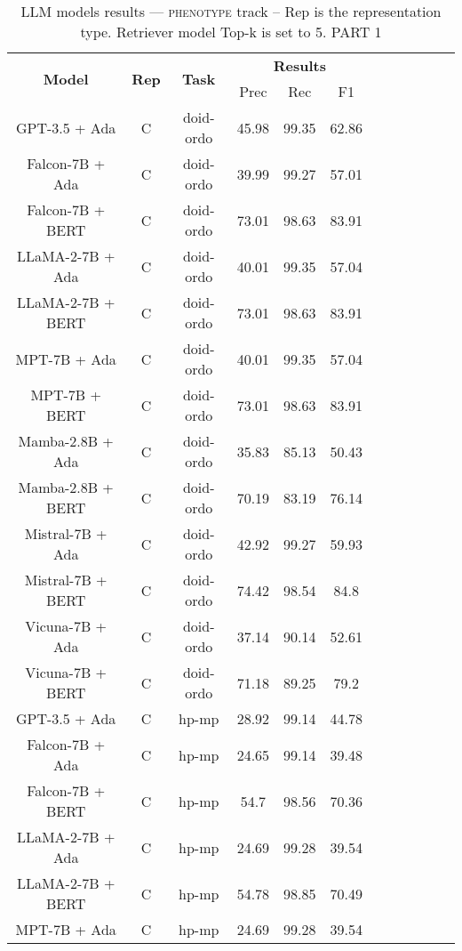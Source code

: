 \begin{table}
        \centering
        \small
        \caption{LLM models results --- \textsc{phenotype} track -- Rep is the representation type. Retriever model Top-k is set to 5. PART 1 } \label{tab:llm_phenotype1}
        \begin{tabular}{|c|c|c|c|c|c|c|c|c|c|c|c|}
            \hline
             \multirow{2}{*}{\textbf{Model}}  & \multirow{2}{*}{\textbf{Rep}}  & \multirow{2}{*}{\textbf{Task}} &  \multicolumn{3}{c|}{\textbf{Results}} \\
             \cline{4-6}
              & & & Prec & Rec & F1  \\
            \hline
	GPT-3.5 + Ada  & C & doid-ordo  &  45.98 &  99.35 & 62.86  \\
	Falcon-7B + Ada  & C & doid-ordo  &  39.99 &  99.27 & 57.01  \\
	Falcon-7B + BERT  & C & doid-ordo  &  73.01 &  98.63 & 83.91  \\
	LLaMA-2-7B + Ada  & C & doid-ordo  &  40.01 &  99.35 & 57.04  \\
	LLaMA-2-7B + BERT  & C & doid-ordo  &  73.01 &  98.63 & 83.91  \\
	MPT-7B + Ada  & C & doid-ordo  &  40.01 &  99.35 & 57.04  \\
	MPT-7B + BERT  & C & doid-ordo  &  73.01 &  98.63 & 83.91  \\
	Mamba-2.8B + Ada  & C & doid-ordo  &  35.83 &  85.13 & 50.43  \\
	Mamba-2.8B + BERT  & C & doid-ordo  &  70.19 &  83.19 & 76.14  \\
	Mistral-7B + Ada  & C & doid-ordo  &  42.92 &  99.27 & 59.93  \\
	Mistral-7B + BERT  & C & doid-ordo  &  74.42 &  98.54 & 84.8  \\
	Vicuna-7B + Ada  & C & doid-ordo  &  37.14 &  90.14 & 52.61  \\
	Vicuna-7B + BERT  & C & doid-ordo  &  71.18 &  89.25 & 79.2  \\
	\hline
	GPT-3.5 + Ada  & C & hp-mp  &  28.92 &  99.14 & 44.78  \\
	Falcon-7B + Ada  & C & hp-mp  &  24.65 &  99.14 & 39.48  \\
	Falcon-7B + BERT  & C & hp-mp  &  54.7 &  98.56 & 70.36  \\
	LLaMA-2-7B + Ada  & C & hp-mp  &  24.69 &  99.28 & 39.54  \\
	LLaMA-2-7B + BERT  & C & hp-mp  &  54.78 &  98.85 & 70.49  \\
	MPT-7B + Ada  & C & hp-mp  &  24.69 &  99.28 & 39.54  \\

\end{tabular}
\end{table}
